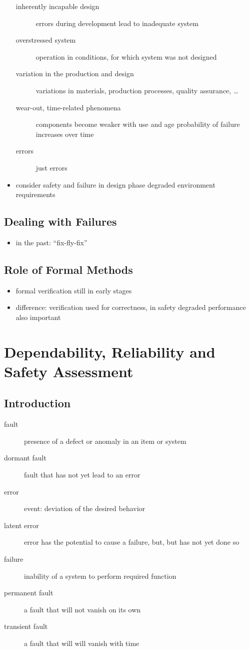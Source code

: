 \documentclass[a4paper, 10pt]{article}
\begin{document}
\begin{itemize}
\begin{description}
        \item[inherently incapable design] errors during development lead to inadequate system
        \item[overstressed system] operation in conditions, for which system was not designed
        \item[variation in the production and design] variations in materials, production processes, quality assurance, \dots
        \item[wear-out, time-related phenomena] components become weaker with use and age \follows probability of failure increases over time
        \item[errors] just errors
    \end{description}
    \item consider safety and failure in design phase \follows degraded environment requirements
\end{itemize}

\subsection*{Dealing with Failures}
\begin{itemize}
    \item in the past: ``fix-fly-fix''
\end{itemize}

\subsection*{Role of Formal Methods}
\begin{itemize}
    \item formal verification still in early stages
    \item difference: verification used for correctness, in safety degraded performance also important
\end{itemize}

\section*{Dependability, Reliability and Safety Assessment}
\subsection*{Introduction}
\begin{description}
    \item[fault] presence of a defect or anomaly in an item or system
    \item[dormant fault] fault that has not yet lead to an error
    \item[error] event: deviation of the desired behavior
    \item[latent error] error has the potential to cause a failure, but, but has not yet done so
    \item[failure] inability of a system to perform required function
    \item[permanent fault] a fault that will not vanish on its own
    \item[transient fault] a fault that will will vanish with time
\end{description}
\end{document}
